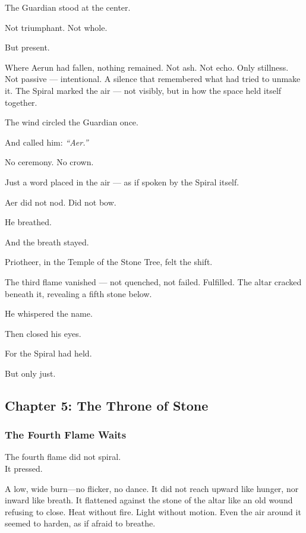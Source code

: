 \documentclass[12pt]{article}
\begin{document}
The Guardian stood at the center.

Not triumphant. Not whole.

But present.

Where Aerun had fallen, nothing remained. Not ash. Not echo. Only stillness. Not passive — intentional. A silence that remembered what had tried to unmake it. The Spiral marked the air — not visibly, but in how the space held itself together.

The wind circled the Guardian once.

And called him: \textit{``Aer.''}

No ceremony. No crown.

Just a word placed in the air — as if spoken by the Spiral itself.

Aer did not nod. Did not bow.

He breathed.

And the breath stayed.

Priotheer, in the Temple of the Stone Tree, felt the shift.

The third flame vanished — not quenched, not failed. Fulfilled. The altar cracked beneath it, revealing a fifth stone below.

He whispered the name.

Then closed his eyes.

For the Spiral had held.

But only just.


\newpage

\subsection*{Chapter 5: The Throne of Stone}

\vspace{.5in}

\subsubsection*{The Fourth Flame Waits}

The fourth flame did not spiral.\\
It pressed.

\vspace{0.5em}
A low, wide burn---no flicker, no dance. It did not reach upward like hunger, nor inward like breath. It flattened against the stone of the altar like an old wound refusing to close. Heat without fire. Light without motion. Even the air around it seemed to harden, as if afraid to breathe.
\end{document}
